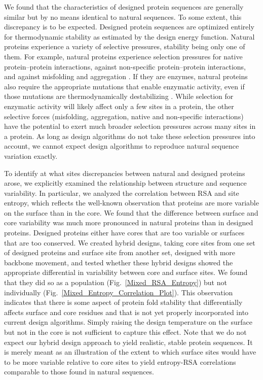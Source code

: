 \documentclass[12pt]{article}
\begin{document}
We found that the characteristics of designed protein sequences are generally similar but by no means identical to natural sequences. To some extent, this discrepancy is to be expected. Designed protein sequences are optimized entirely for thermodynamic stability as estimated by the design energy function. Natural proteins experience a variety of selective pressures, stability being only one of them. For example, natural proteins experience selection pressures for native protein--protein interactions, against non-specific protein--protein interactions, and against misfolding and aggregation  \citep{Fraser2002, Zarrinpar2003, Drummond2008, Levyetal2012}. If they are enzymes, natural proteins also require the appropriate mutations that enable enzymatic activity, even if those mutations are thermodynamically destabilizing \citep{Bloometal2006, Elcock2001}. While selection for enzymatic activity will likely affect only a few sites in a protein, the other selective forces (misfolding, aggregation, native and non-specific interactions) have the potential to exert much broader selection pressures across many sites in a protein. As long as design algorithms do not take these selection pressures into account, we cannot expect design algorithms to reproduce natural sequence variation exactly.

To identify at what sites discrepancies between natural and designed proteins arose, we explicitly examined the relationship between structure and sequence variability. In particular, we analyzed the correlation between RSA and site entropy, which reflects the well-known observation that proteins are more variable on the surface than in the core. We found that the difference between surface and core variability was much more pronounced in natural proteins than in designed proteins. Designed proteins either have cores that are too variable or surfaces that are too conserved. We created hybrid designs, taking core sites from one set of designed proteins and surface site from another set, designed with more backbone movement, and tested whether these hybrid designs showed the appropriate differential in variability between core and surface sites. We found that they did so as a population (Fig.~\ref{Mixed_RSA_Entropy}) but not individually (Fig.~\ref{Mixed_Entropy_Correlation_Plot}). This observation indicates that there is some aspect of protein fold stability that differentially affects surface and core residues and that is not yet properly incorporated into current design algorithms. Simply raising the design temperature on the surface but not in the core is not sufficient to capture this effect. Note that we do not expect our hybrid design approach to yield realistic, stable protein sequences. It is merely meant as an illustration of the extent to which surface sites would have to be more variable relative to core sites to yield entropy-RSA correlations comparable to those found in natural sequences. 
\end{document}
